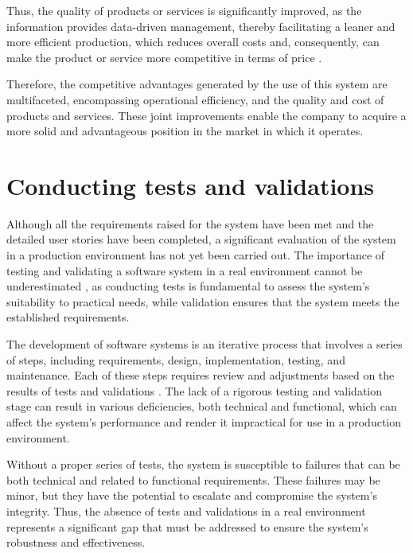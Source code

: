 Thus, the quality of products or services is significantly improved, as the information provides data-driven management, thereby facilitating a leaner and more efficient production, which reduces overall costs and, consequently, can make the product or service more competitive in terms of price \cite{glowalla2014processDriven}.

Therefore, the competitive advantages generated by the use of this system are multifaceted, encompassing operational efficiency, and the quality and cost of products and services. These joint improvements enable the company to acquire a more solid and advantageous position in the market in which it operates.

\section{Conducting tests and validations}\label{sec:tests}
Although all the requirements raised for the system have been met and the detailed user stories have been completed, a significant evaluation of the system in a production environment has not yet been carried out. The importance of testing and validating a software system in a real environment cannot be underestimated \cite{leTraon1999selfTestable}, as conducting tests is fundamental to assess the system's suitability to practical needs, while validation ensures that the system meets the established requirements.

The development of software systems is an iterative process that involves a series of steps, including requirements, design, implementation, testing, and maintenance. Each of these steps requires review and adjustments based on the results of tests and validations \cite{coleman2006softwareProcess}. The lack of a rigorous testing and validation stage can result in various deficiencies, both technical and functional, which can affect the system's performance and render it impractical for use in a production environment.

Without a proper series of tests, the system is susceptible to failures that can be both technical and related to functional requirements. These failures may be minor, but they have the potential to escalate and compromise the system's integrity. Thus, the absence of tests and validations in a real environment represents a significant gap that must be addressed to ensure the system's robustness and effectiveness.